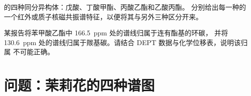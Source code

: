 \begin{exercise}[$\star\star\star$]\label{exo:b2:structure-determination:11}
 的四种同分异构体：戊酸、丁酸甲酯、丙酸乙酯和乙酸丙酯。
分别给出每一种的一个红外或质子核磁共振谱特征，以便将其与另外三种区分开来。
\end{exercise}

\begin{exercise}[$\star\star\star$]\label{exo:b2:structure-determination:12}
某报告将苯甲酸乙酯中 166.5~ppm 处的谱线归属于连有酯基的环碳，
并将 130.6~ppm 处的谱线归属于羰基碳。请结合 DEPT 数据与化学位移表，说明该归属
不可能正确。
\end{exercise}

\section{问题：茉莉花的四种谱图}

